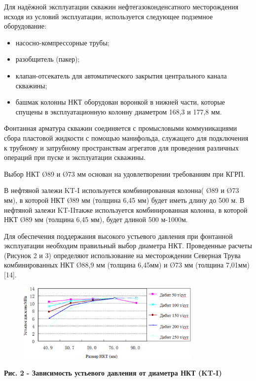 Для надёжной эксплуатации скважин нефтегазоконденсатного месторождения
исходя из условий эксплуатации, используется следующее подземное
оборудование:

\begin{itemize}
\item
  насосно-компрессорные трубы;
\item
  разобщитель (пакер);
\item
  клапан-отсекатель для автоматического закрытия центрального канала
  скважины;
\item
  башмак колонны НКТ оборудован воронкой в нижней части, которые спущены
  в эксплуатационную колонну диаметром 168,3 и 177,8 мм.
\end{itemize}

Фонтанная арматура скважин соединяется с промысловыми коммуникациями
сбора пластовой жидкости с помощью манифольда, служащего для подключения
к трубному и затрубному пространствам агрегатов для проведения различных
операций при пуске и эксплуатации скважины.

Выбор НКТ Ø89 и Ø73 мм основан на удовлетворении требованиям при КГРП.

В нефтяной залежи KT-I используется комбинированная колонна( Ø89 и Ø73
мм), в которой НКТ Ø89 мм (толщина 6,45 мм) будет иметь длину до 500 м.
В нефтяной залежи KT-IIтакже используется комбинированная колонна, в
которой НКТ Ø89 мм (толщина 6,45 мм), будет длиной 500 м-1000м.

Для обеспечения поддержания высокого устьевого давления при фонтанной
эксплуатации необходим правильный выбор диаметра НКТ. Проведенные
расчеты (Рисунок 2 и 3) определяют использование на месторождении
Северная Трува комбинированных НКТ Ø88,9 мм (толщина 6,45мм) и Ø73 мм
(толщина 7,01мм) {[}14{]}.

\begin{figure}[H]
	\centering
	\includegraphics[width=0.8\textwidth]{assets/302}
	\caption*{}
\end{figure}

{\bfseries Рис. 2 - Зависимость устьевого давления от диаметра НКТ (KT-I)}

